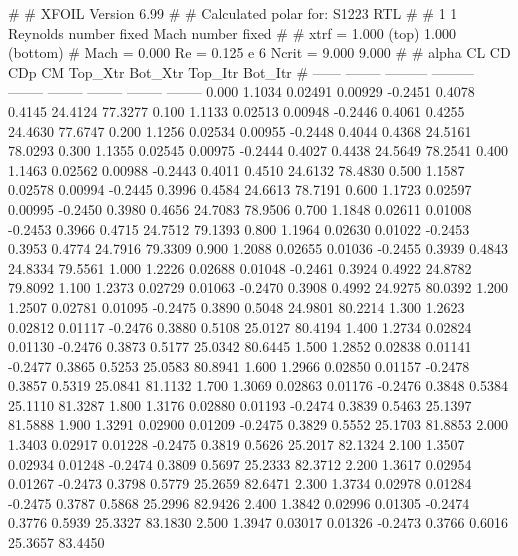 #  
#       XFOIL         Version 6.99
#  
# Calculated polar for: S1223 RTL                                       
#  
# 1 1 Reynolds number fixed          Mach number fixed         
#  
# xtrf =   1.000 (top)        1.000 (bottom)  
# Mach =   0.000     Re =     0.125 e 6     Ncrit =   9.000  9.000
#  
#   alpha    CL        CD       CDp       CM     Top_Xtr  Bot_Xtr  Top_Itr  Bot_Itr
#  ------ -------- --------- --------- -------- -------- -------- -------- --------
   0.000   1.1034   0.02491   0.00929  -0.2451   0.4078   0.4145  24.4124  77.3277
   0.100   1.1133   0.02513   0.00948  -0.2446   0.4061   0.4255  24.4630  77.6747
   0.200   1.1256   0.02534   0.00955  -0.2448   0.4044   0.4368  24.5161  78.0293
   0.300   1.1355   0.02545   0.00975  -0.2444   0.4027   0.4438  24.5649  78.2541
   0.400   1.1463   0.02562   0.00988  -0.2443   0.4011   0.4510  24.6132  78.4830
   0.500   1.1587   0.02578   0.00994  -0.2445   0.3996   0.4584  24.6613  78.7191
   0.600   1.1723   0.02597   0.00995  -0.2450   0.3980   0.4656  24.7083  78.9506
   0.700   1.1848   0.02611   0.01008  -0.2453   0.3966   0.4715  24.7512  79.1393
   0.800   1.1964   0.02630   0.01022  -0.2453   0.3953   0.4774  24.7916  79.3309
   0.900   1.2088   0.02655   0.01036  -0.2455   0.3939   0.4843  24.8334  79.5561
   1.000   1.2226   0.02688   0.01048  -0.2461   0.3924   0.4922  24.8782  79.8092
   1.100   1.2373   0.02729   0.01063  -0.2470   0.3908   0.4992  24.9275  80.0392
   1.200   1.2507   0.02781   0.01095  -0.2475   0.3890   0.5048  24.9801  80.2214
   1.300   1.2623   0.02812   0.01117  -0.2476   0.3880   0.5108  25.0127  80.4194
   1.400   1.2734   0.02824   0.01130  -0.2476   0.3873   0.5177  25.0342  80.6445
   1.500   1.2852   0.02838   0.01141  -0.2477   0.3865   0.5253  25.0583  80.8941
   1.600   1.2966   0.02850   0.01157  -0.2478   0.3857   0.5319  25.0841  81.1132
   1.700   1.3069   0.02863   0.01176  -0.2476   0.3848   0.5384  25.1110  81.3287
   1.800   1.3176   0.02880   0.01193  -0.2474   0.3839   0.5463  25.1397  81.5888
   1.900   1.3291   0.02900   0.01209  -0.2475   0.3829   0.5552  25.1703  81.8853
   2.000   1.3403   0.02917   0.01228  -0.2475   0.3819   0.5626  25.2017  82.1324
   2.100   1.3507   0.02934   0.01248  -0.2474   0.3809   0.5697  25.2333  82.3712
   2.200   1.3617   0.02954   0.01267  -0.2473   0.3798   0.5779  25.2659  82.6471
   2.300   1.3734   0.02978   0.01284  -0.2475   0.3787   0.5868  25.2996  82.9426
   2.400   1.3842   0.02996   0.01305  -0.2474   0.3776   0.5939  25.3327  83.1830
   2.500   1.3947   0.03017   0.01326  -0.2473   0.3766   0.6016  25.3657  83.4450
